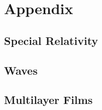 \documentclass{book}
\begin{document}
\part*{Appendix}
\appendix
\begin{comment}
\chapter{Electric Circuits}
\section{Electronics}
\section{DC Current}
\section{AC Current}
\chapter{Magnetic Circuits}
\end{comment}
\chapter{Special Relativity}

\chapter{Waves}

\chapter{Multilayer Films}

\nocite{griffem,jackson,landau2,zangwillem,fowles,fourieropt}
\printbibliography
\end{document}
